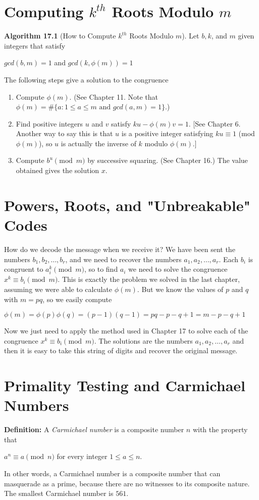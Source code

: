 \documentclass{article}
\begin{document}
\section{Computing $k^{th}$ Roots Modulo $m$}
{\bf Algorithm 17.1} (How to Compute $k^{th}$ Roots Modulo $m$). Let $b, k$, and $m$ given integers that satisfy
\begin{center}
$gcd(b,m) = 1$ and $gcd(k, \phi(m)) = 1$
\end{center}
The following steps give a solution to the congruence
\begin{enumerate}
\item Compute $\phi(m)$. (See Chapter 11. Note that $\phi(m) = \#\{a:1\leqslant a \leqslant m \text{ and } gcd(a, m)=1\}$.)
\item Find positive integers $u$ and $v$ satisfy $ku-\phi(m)v=1$. [See Chapter 6. Another way to say this is that $u$ is a positive integer satisfying $ku\equiv 1$ (mod $\phi(m)$), so $u$ is actually the inverse of $k$ modulo $\phi(m)$.]
\item Compute $b^u \pmod m$ by successive squaring. (See Chapter 16.) The value obtained gives the solution $x$.
\end{enumerate}

\section{Powers, Roots, and "Unbreakable" Codes}

How do we decode the message when we receive it? We have been sent the numbers $b_1, b_2, \ldots, b_r$, and we need to recover the numbers $a_1, a_2, \ldots, a_r$. Each $b_i$ is congruent to $a_i^k \pmod m$, so to find $a_i$ we need to solve the congruence $x^k \equiv b_i \pmod m$. This is exactly the problem we solved in the last chapter, assuming we were able to calculate $\phi(m)$. But we know the values of $p$ and $q$ with $m=pq$, so we easily compute
\begin{center}
$\phi(m)=\phi(p)\phi(q)=(p-1)(q-1)=pq-p-q+1=m-p-q+1$
\end{center}
Now we just need to apply the method used in Chapter 17 to solve each of the congruence $x^k \equiv b_i \pmod m$. The solutions are the numbers $a_1, a_2, \ldots, a_r$ and then it is easy to take this string of digits and recover the original message.

\section{Primality Testing and Carmichael Numbers}
\textbf{Definition:} A \textit{Carmichael number} is a composite number $n$ with the property that
\begin{center}
$a^n \equiv a \pmod n$ for every integer $1\leqslant a\leqslant n.$
\end{center}
In other words, a Carmichael number is a composite number that can masquerade as a prime, because there are no witnesses to its composite nature. The smallest Carmichael number is $561$.
\end{document}
